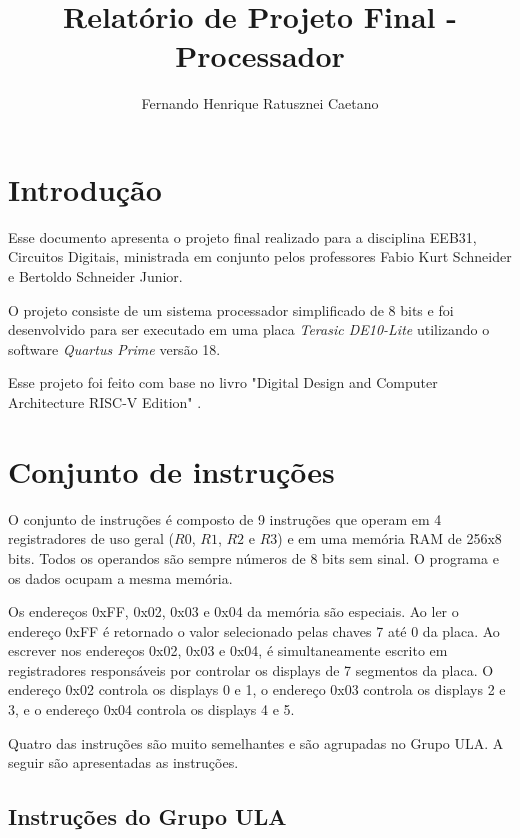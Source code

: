 \documentclass[a4paper, 12pt]{article}
\title{Relatório de Projeto Final - Processador}
\author{Fernando Henrique Ratusznei Caetano}
\date{ }
\begin{document}
\maketitle
\tableofcontents

\newpage
\section{Introdução}

\par
Esse documento apresenta o projeto final realizado para a disciplina
EEB31, Circuitos Digitais, ministrada em conjunto pelos professores
Fabio Kurt Schneider e Bertoldo Schneider Junior.

\par
O projeto consiste de um sistema processador simplificado de 8 bits
e foi desenvolvido para ser executado em uma placa \textit{Terasic DE10-Lite}
utilizando o software \textit{Quartus Prime} versão 18.

\par
Esse projeto foi feito com base no livro "Digital Design and Computer Architecture RISC-V Edition" \cite{digdes}.

\newpage
\section{Conjunto de instruções}
\par
O conjunto de instruções é composto de 9 instruções que operam em 4
registradores de uso geral ($R0$, $R1$, $R2$ e $R3$) e em uma memória
RAM de 256x8 bits. Todos os operandos são sempre números de 8 bits sem
sinal. O programa e os dados ocupam a mesma memória.

Os endereços 0xFF, 0x02, 0x03 e 0x04 da memória são especiais.
Ao ler o endereço 0xFF é retornado o valor selecionado pelas chaves
7 até 0 da placa. Ao escrever nos endereços 0x02, 0x03 e 0x04, é simultaneamente
escrito em registradores responsáveis por controlar os displays de 7 segmentos
da placa. O endereço 0x02 controla os displays 0 e 1, o endereço 0x03 controla os 
displays 2 e 3, e o endereço 0x04 controla os displays 4 e 5.

Quatro das instruções são muito semelhantes e são agrupadas no Grupo ULA.
A seguir são apresentadas as instruções.

\subsection{Instruções do Grupo ULA}
\begin{table}[ht]
	\centering
	\caption{Formato das instruções codificadas no Grupo ULA}
	\label{tab:ula_format}
\end{table}
\end{document}
